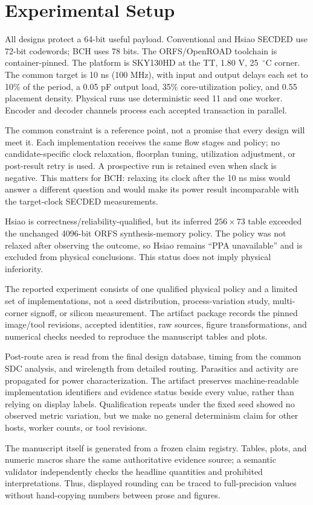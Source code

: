\section{Experimental Setup}

All designs protect a 64-bit useful payload. Conventional and Hsiao SECDED use 72-bit codewords; BCH uses 78 bits. The ORFS/OpenROAD toolchain is container-pinned. The platform is SKY130HD at the TT, 1.80 V, 25~$^{\circ}$C corner. The common target is 10 ns (100 MHz), with input and output delays each set to 10\% of the period, a 0.05 pF output load, 35\% core-utilization policy, and 0.55 placement density. Physical runs use deterministic seed 11 and one worker. Encoder and decoder channels process each accepted transaction in parallel.

The common constraint is a reference point, not a promise that every design will meet it. Each implementation receives the same flow stages and policy; no candidate-specific clock relaxation, floorplan tuning, utilization adjustment, or post-result retry is used. A prospective run is retained even when slack is negative. This matters for BCH: relaxing its clock after the 10 ns miss would answer a different question and would make its power result incomparable with the target-clock SECDED measurements.



Hsiao is correctness/reliability-qualified, but its inferred $256\times73$ table exceeded the unchanged 4096-bit ORFS synthesis-memory policy. The policy was not relaxed after observing the outcome, so Hsiao remains ``PPA unavailable'' and is excluded from physical conclusions. This status does not imply physical inferiority.

The reported experiment consists of one qualified physical policy and a limited set of implementations, not a seed distribution, process-variation study, multi-corner signoff, or silicon measurement. The artifact package records the pinned image/tool revisions, accepted identities, raw sources, figure transformations, and numerical checks needed to reproduce the manuscript tables and plots.

Post-route area is read from the final design database, timing from the common SDC analysis, and wirelength from detailed routing. Parasitics and activity are propagated for power characterization. The artifact preserves machine-readable implementation identifiers and evidence status beside every value, rather than relying on display labels. Qualification repeats under the fixed seed showed no observed metric variation, but we make no general determinism claim for other hosts, worker counts, or tool revisions.

The manuscript itself is generated from a frozen claim registry. Tables, plots, and numeric macros share the same authoritative evidence source; a semantic validator independently checks the headline quantities and prohibited interpretations. Thus, displayed rounding can be traced to full-precision values without hand-copying numbers between prose and figures.
